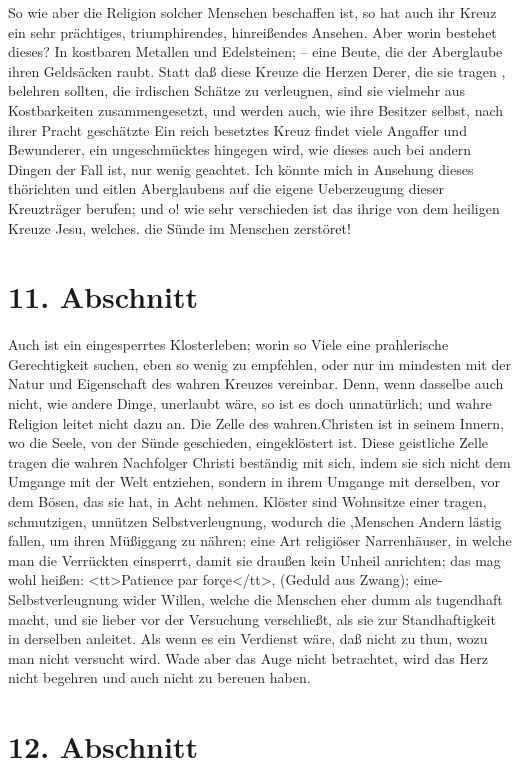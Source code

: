 So wie aber die Religion solcher Menschen beschaffen ist, so hat auch ihr Kreuz ein sehr prächtiges, triumphirendes, hinreißendes Ansehen. Aber worin bestehet dieses? In kostbaren Metallen und Edelsteinen; -- eine Beute, die der Aberglaube ihren Geldsäcken raubt. Statt daß diese Kreuze die Herzen Derer, die sie tragen , belehren sollten, die irdischen Schätze zu verleugnen, sind sie vielmehr aus Kostbarkeiten zusammengesetzt, und werden auch, wie ihre Besitzer selbst, nach ihrer Pracht geschätzte Ein reich besetztes Kreuz findet viele Angaffer und Bewunderer, ein ungeschmücktes hingegen wird, wie dieses auch bei andern Dingen der Fall ist, nur wenig geachtet. Ich könnte mich in Ansehung dieses thörichten und eitlen Aberglaubens auf die eigene Ueberzeugung dieser Kreuzträger berufen; und o! wie sehr verschieden ist das ihrige von dem heiligen Kreuze Jesu, welches. die Sünde im Menschen zerstöret!

\section{11. Abschnitt}

Auch ist ein eingesperrtes Klosterleben; worin so Viele eine prahlerische Gerechtigkeit suchen, eben so wenig zu empfehlen, oder nur im mindesten mit der Natur und Eigenschaft des wahren Kreuzes vereinbar. Denn, wenn dasselbe auch nicht, wie andere Dinge, unerlaubt wäre, so ist es doch unnatürlich; und wahre Religion leitet nicht dazu an. Die Zelle des wahren.Christen ist in seinem Innern, wo die Seele, von der Sünde geschieden, eingeklöstert ist. Diese geistliche Zelle tragen die wahren Nachfolger Christi beständig mit sich, indem sie sich nicht dem Umgange mit der Welt entziehen, sondern in ihrem Umgange mit derselben, vor dem Bösen, das sie hat, in Acht nehmen. Klöster sind Wohnsitze einer tragen, schmutzigen, unnützen Selbstverleugnung, wodurch die ,Menschen Andern lästig fallen, um ihren Müßiggang zu nähren; eine Art religiöser Narrenhäuser, in welche man die Verrückten einsperrt, damit sie draußen kein Unheil anrichten; das mag wohl heißen: <tt>Patience par forçe</tt>, (Geduld aus Zwang); eine- Selbstverleugnung wider  Willen, welche die Menschen eher dumm als tugendhaft macht, und sie lieber vor der Versuchung verschließt, als sie zur Standhaftigkeit in derselben anleitet. Als wenn es ein Verdienst wäre, daß nicht zu thun, wozu man nicht versucht wird. Wade aber das Auge nicht betrachtet, wird das Herz nicht begehren und auch nicht zu bereuen haben.

\section{12. Abschnitt}

